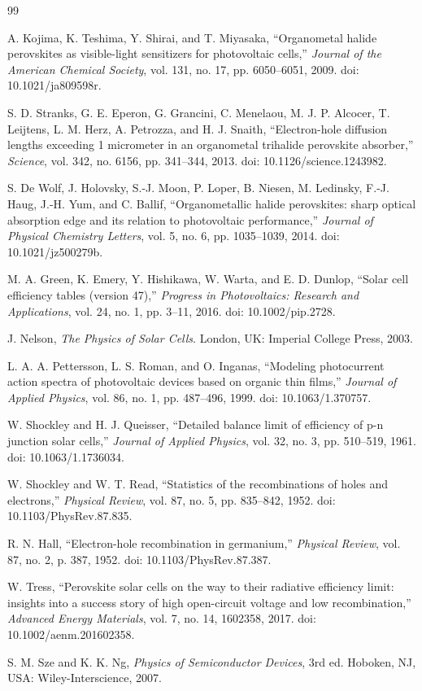 \documentclass[12pt,a4paper,UTF8]{article}
\begin{document}
\clearpage
\begin{thebibliography}{99}

A. Kojima, K. Teshima, Y. Shirai, and T. Miyasaka,
``Organometal halide perovskites as visible-light sensitizers for photovoltaic cells,''
\textit{Journal of the American Chemical Society}, vol. 131, no. 17, pp. 6050--6051, 2009.
doi: 10.1021/ja809598r.

S. D. Stranks, G. E. Eperon, G. Grancini, C. Menelaou, M. J. P. Alcocer, T. Leijtens, L. M. Herz, A. Petrozza, and H. J. Snaith,
``Electron-hole diffusion lengths exceeding 1 micrometer in an organometal trihalide perovskite absorber,''
\textit{Science}, vol. 342, no. 6156, pp. 341--344, 2013.
doi: 10.1126/science.1243982.

S. De Wolf, J. Holovsky, S.-J. Moon, P. Loper, B. Niesen, M. Ledinsky, F.-J. Haug, J.-H. Yum, and C. Ballif,
``Organometallic halide perovskites: sharp optical absorption edge and its relation to photovoltaic performance,''
\textit{Journal of Physical Chemistry Letters}, vol. 5, no. 6, pp. 1035--1039, 2014.
doi: 10.1021/jz500279b.

M. A. Green, K. Emery, Y. Hishikawa, W. Warta, and E. D. Dunlop,
``Solar cell efficiency tables (version 47),''
\textit{Progress in Photovoltaics: Research and Applications}, vol. 24, no. 1, pp. 3--11, 2016.
doi: 10.1002/pip.2728.

J. Nelson,
\textit{The Physics of Solar Cells}.
London, UK: Imperial College Press, 2003.

L. A. A. Pettersson, L. S. Roman, and O. Inganas,
``Modeling photocurrent action spectra of photovoltaic devices based on organic thin films,''
\textit{Journal of Applied Physics}, vol. 86, no. 1, pp. 487--496, 1999.
doi: 10.1063/1.370757.

W. Shockley and H. J. Queisser,
``Detailed balance limit of efficiency of p-n junction solar cells,''
\textit{Journal of Applied Physics}, vol. 32, no. 3, pp. 510--519, 1961.
doi: 10.1063/1.1736034.

W. Shockley and W. T. Read,
``Statistics of the recombinations of holes and electrons,''
\textit{Physical Review}, vol. 87, no. 5, pp. 835--842, 1952.
doi: 10.1103/PhysRev.87.835.

R. N. Hall,
``Electron-hole recombination in germanium,''
\textit{Physical Review}, vol. 87, no. 2, p. 387, 1952.
doi: 10.1103/PhysRev.87.387.

W. Tress,
``Perovskite solar cells on the way to their radiative efficiency limit: insights into a success story of high open-circuit voltage and low recombination,''
\textit{Advanced Energy Materials}, vol. 7, no. 14, 1602358, 2017.
doi: 10.1002/aenm.201602358.

S. M. Sze and K. K. Ng,
\textit{Physics of Semiconductor Devices}, 3rd ed.
Hoboken, NJ, USA: Wiley-Interscience, 2007.

\end{thebibliography}
\end{document}
